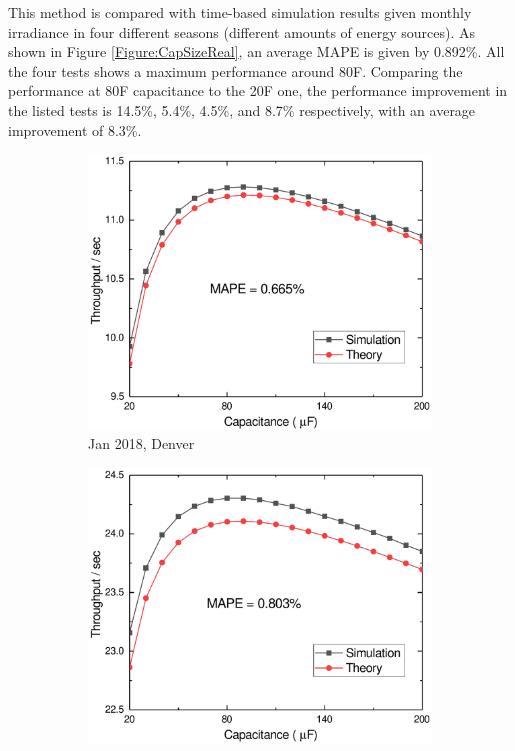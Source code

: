 This method is compared with time-based simulation results given monthly irradiance in four different seasons (different amounts of energy sources). As shown in Figure \ref{Figure:CapSizeReal}, an average MAPE is given by 0.892\%. All the four tests shows a maximum performance around 80\textmu F. Comparing the performance at 80\textmu F capacitance to the 20\textmu F one, the performance improvement in the listed tests is 14.5\%, 5.4\%, 4.5\%, and 8.7\% respectively, with an average improvement of 8.3\%.


\begin{figure}[H]
    \centering
    \begin{subfigure}{0.49\textwidth}
        \centering
        \includegraphics[width=\textwidth]{figure/work1/CapDenvJan}
        \caption{Jan 2018, Denver}
    \end{subfigure}
    \begin{subfigure}{0.49\textwidth}
        \centering
        \includegraphics[width=\textwidth]{figure/work1/CapDenvApr}

\end{subfigure}
\end{figure}
